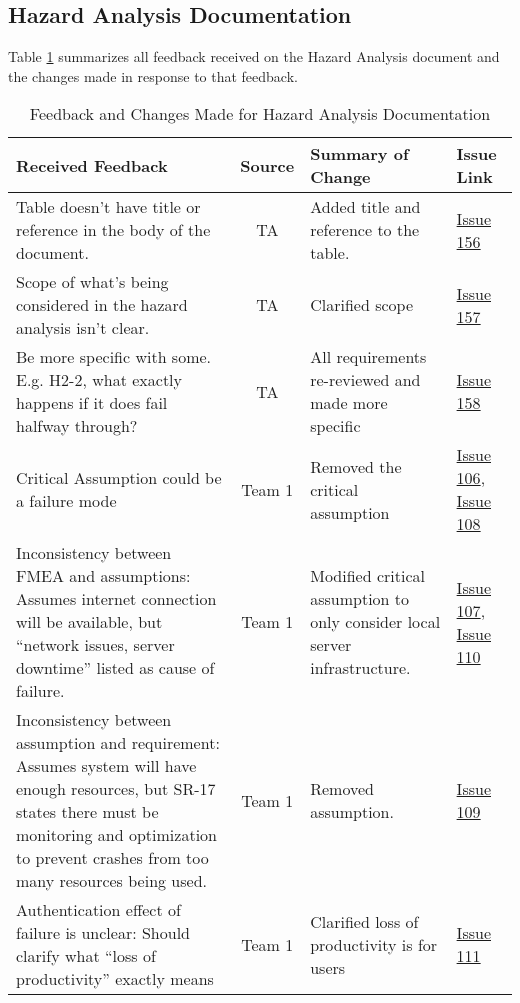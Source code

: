 \documentclass{article}
\begin{document}
\subsection{Hazard Analysis Documentation}
Table \ref{table:HA} summarizes all feedback received on the Hazard Analysis
document and the changes made in response to that feedback.
\begin{table}[H]
\centering
\begin{tabularx}{\textwidth}{|X|c|X|p{1.5cm}|}
    \hline
    \textbf{Received Feedback} & \textbf{Source} & \textbf{Summary of Change}
    & \textbf{Issue Link} \\
    \hline
    Table doesn't have title or reference in the body of the document. & TA
    & Added title and reference to the table. &
    \href{https://github.com/SumanyaG/Alkalytics/issues/156}{Issue 156} \\
    \hline
    Scope of what's being considered in the hazard analysis isn't clear. & TA &
    Clarified scope &
    \href{https://github.com/SumanyaG/Alkalytics/issues/157}{Issue 157} \\
    \hline
    Be more specific with some. E.g. H2-2, what exactly happens if it does fail
    halfway through? & TA & All requirements re-reviewed and made more specific
    & \href{https://github.com/SumanyaG/Alkalytics/issues/158}{Issue 158} \\
    \hline
    Critical Assumption could be a failure mode & Team 1 & Removed the critical
    assumption & \href{https://github.com/SumanyaG/Alkalytics/issues/106}{Issue
    106}, \newline
    \href{https://github.com/SumanyaG/Alkalytics/issues/108}{Issue 108} \\
    \hline
    Inconsistency between FMEA and assumptions: Assumes internet connection
    will be available, but ``network issues, server downtime'' listed as cause
    of failure. & Team 1 & Modified critical assumption to only consider local
    server infrastructure. &
    \href{https://github.com/SumanyaG/Alkalytics/issues/107}{Issue
    107}, \newline
    \href{https://github.com/SumanyaG/Alkalytics/issues/110}{Issue 110} \\
    \hline
    Inconsistency between assumption and requirement: Assumes system will have
    enough resources, but SR-17 states there must be monitoring and optimization
    to prevent crashes from too many resources being used. & Team 1 & Removed
    assumption. & \href{https://github.com/SumanyaG/Alkalytics/issues/109}{Issue
    109} \\
    \hline
    Authentication effect of failure is unclear: Should clarify what ``loss of
    productivity'' exactly means & Team 1 & Clarified loss of productivity is
    for users & \href{https://github.com/SumanyaG/Alkalytics/issues/111}{Issue
    111} \\
    \hline
\end{tabularx}
\caption{Feedback and Changes Made for Hazard Analysis Documentation}
\label{table:HA}
\end{table}
\end{document}
